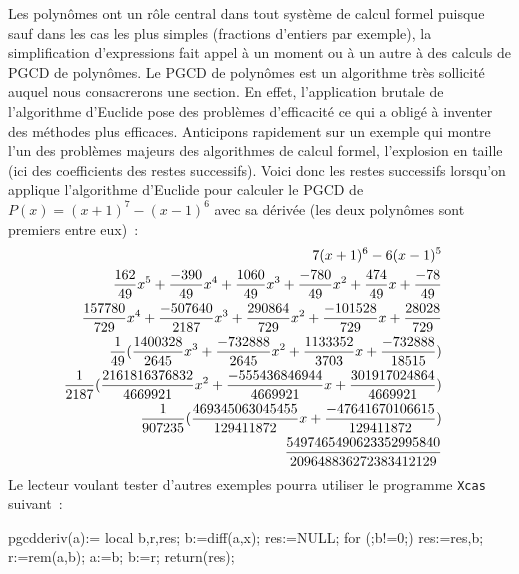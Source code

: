 \documentclass[a4paper,11pt]{book}
\begin{document}
\begin{giacjshere}
Les polynômes ont un r\^ole central dans tout syst\`eme de calcul formel
puisque sauf dans les cas les plus simples (fractions d'entiers par exemple), 
la simplification d'expressions
fait appel \`a un moment ou \`a un autre \`a des calculs
de PGCD de polyn\^omes. Le PGCD de polynômes est un algorithme 
très sollicité auquel nous consacrerons une section. En effet,
l'application brutale de l'algorithme d'Euclide pose des problèmes
d'efficacité ce qui a obligé à inventer des méthodes plus efficaces.
Anticipons rapidement sur un exemple qui montre l'un des problèmes
majeurs des algorithmes de calcul formel, l'explosion en taille
(ici des coefficients des restes successifs).
Voici donc les restes successifs lorsqu'on applique l'algorithme
d'Euclide pour calculer le PGCD de $P(x)=(x+1)^{7}-(x-1)^{6}$ avec
sa d\'eriv\'ee (les deux polyn\^omes sont premiers entre eux)~:
\begin{eqnarray*}
7\* (x+1)^{6}-6\* (x-1)^{5} & &\\
\frac{162}{49} \* x^{5}+\frac{-390}{49} \* x^{4}+\frac{1060}{49} \* x^{3}+\frac{-780}{49} \* x^{2}+\frac{474}{49} \* x+\frac{-78}{49}& &\\
\frac{157780}{729} \* x^{4}+\frac{-507640}{2187} \* x^{3}+\frac{290864}{729} \* x^{2}+\frac{-101528}{729} \* x+\frac{28028}{729}& &\\
\frac{1}{49} \* (\frac{1400328}{2645} \* x^{3}+\frac{-732888}{2645} \* x^{2}+\frac{1133352}{3703} \* x+\frac{-732888}{18515})& &\\
\frac{1}{2187} \* (\frac{2161816376832}{4669921} \* x^{2}+\frac{-555436846944}{4669921} \* x+\frac{301917024864}{4669921})& &\\
\frac{1}{907235} \* (\frac{469345063045455}{129411872} \* x+\frac{-47641670106615}{129411872})& &\\
\frac{5497465490623352995840}{209648836272383412129}
\end{eqnarray*}
Le lecteur voulant tester d'autres exemples pourra utiliser le programme 
\verb|Xcas| suivant~:
\begin{giacprog}
pgcdderiv(a):={
  local b,r,res;
  b:=diff(a,x);
  res:=NULL;
  for (;b!=0;){
    res:=res,b;
    r:=rem(a,b);
    a:=b;
    b:=r;
  }
  return(res);
}
\end{giacprog}


\end{giacjshere}
\end{document}
